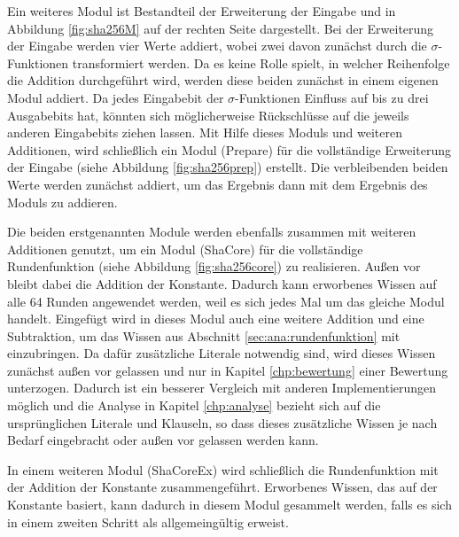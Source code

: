 Ein weiteres Modul ist Bestandteil der Erweiterung der Eingabe und in Abbildung \ref{fig:sha256M} auf der rechten Seite
dargestellt. Bei der Erweiterung der Eingabe werden vier Werte addiert, wobei zwei davon zunächst durch die $ \sigma $-Funktionen
transformiert werden. Da es keine Rolle spielt, in welcher Reihenfolge die Addition durchgeführt wird, werden diese
beiden zunächst in einem eigenen Modul addiert. Da jedes Eingabebit der $ \sigma $-Funktionen Einfluss auf bis zu
drei Ausgabebits hat, könnten sich möglicherweise Rückschlüsse auf die jeweils anderen Eingabebits ziehen lassen.
Mit Hilfe dieses Moduls und weiteren Additionen, wird schließlich ein Modul (Prepare) für die vollständige Erweiterung der Eingabe
(siehe Abbildung \ref{fig:sha256prep}) erstellt. Die verbleibenden beiden Werte werden zunächst addiert, um das Ergebnis
dann mit dem Ergebnis des Moduls zu addieren.

Die beiden erstgenannten Module werden ebenfalls zusammen mit weiteren Additionen genutzt, um ein Modul (ShaCore) für die vollständige
Rundenfunktion (siehe Abbildung \ref{fig:sha256core}) zu realisieren. Außen vor bleibt dabei die Addition der Konstante.
Dadurch kann erworbenes Wissen auf alle 64 Runden angewendet werden, weil es sich jedes Mal um das gleiche Modul handelt.
Eingefügt wird in dieses Modul auch eine weitere Addition und eine Subtraktion, um das Wissen aus Abschnitt \ref{sec:ana:rundenfunktion}
mit einzubringen. Da dafür zusätzliche Literale notwendig sind, wird dieses Wissen zunächst außen vor gelassen und nur in Kapitel
\ref{chp:bewertung} einer Bewertung unterzogen. Dadurch ist ein besserer Vergleich mit anderen Implementierungen möglich und
die Analyse in Kapitel \ref{chp:analyse} bezieht sich auf die ursprünglichen Literale und Klauseln, so dass dieses zusätzliche
Wissen je nach Bedarf eingebracht oder außen vor gelassen werden kann.

In einem weiteren Modul (ShaCoreEx) wird schließlich die Rundenfunktion mit der Addition der Konstante zusammengeführt.
Erworbenes Wissen, das auf der Konstante basiert, kann dadurch in diesem Modul gesammelt werden, falls es sich in einem
zweiten Schritt als allgemeingültig erweist.

